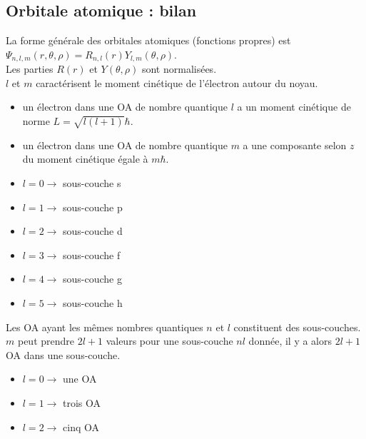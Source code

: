 \documentclass[../main.tex]{subfile}
\begin{document}
\subsection{Orbitale atomique : bilan}

   La forme générale des orbitales atomiques (fonctions propres) est $\Psi_{n,l,m}(r, \theta, \rho) = R_{n,l}(r)Y_{l,m}(\theta, \rho)$.\\

   Les parties $R(r)$ et $Y(\theta, \rho)$ sont normalisées.\\

   $l$ et $m$ caractérisent le moment cinétique de l'électron autour du noyau.\\

  \begin{itemize} 
         \item un électron dans une OA de nombre quantique $l$ a un moment cinétique de norme $L=\sqrt{l(l+1)}\hbar$.
         \item un électron dans une OA de nombre quantique $m$ a une composante selon $z$ du moment cinétique égale à $m\hbar$.\\
  \end{itemize}

 \begin{itemize} 
         \item $l = 0 \rightarrow $ sous-couche s
         \item $l = 1 \rightarrow $ sous-couche p
         \item $l = 2 \rightarrow $ sous-couche d
         \item $l = 3 \rightarrow $ sous-couche f
         \item $l = 4 \rightarrow $ sous-couche g
         \item $l = 5 \rightarrow $ sous-couche h
 \end{itemize}


 Les OA ayant les mêmes nombres quantiques $n$ et $l$ constituent des sous-couches.\\

 $m$ peut prendre $2l+1$ valeurs pour une sous-couche $nl$ donnée, il y a alors $2l + 1$ OA dans une sous-couche.

\begin{itemize}
         \item $l = 0 \rightarrow $ une OA
         \item $l = 1 \rightarrow $ trois OA
         \item $l = 2 \rightarrow $ cinq OA
\end{itemize}
\end{document}
